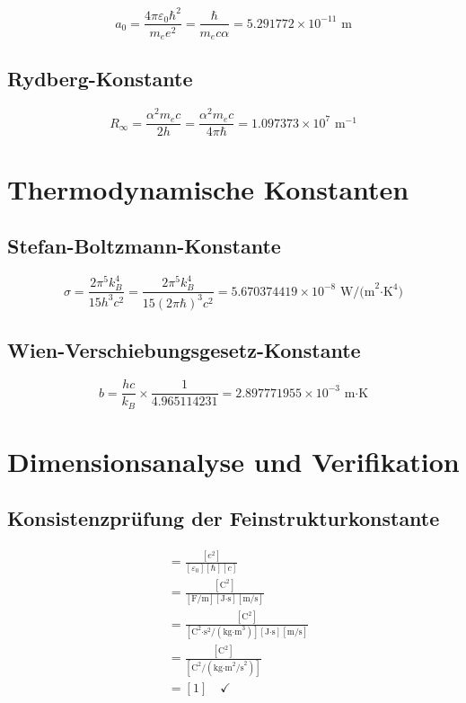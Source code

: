 	\begin{equation}
		a_0 = \frac{4\pi\varepsilon_0\hbar^2}{m_e e^2} = \frac{\hbar}{m_e c \alpha} = 5.291772 \times 10^{-11} \text{ m}
	\end{equation}
	
	\subsection{Rydberg-Konstante}
	
	\begin{equation}
		R_\infty = \frac{\alpha^2 m_e c}{2h} = \frac{\alpha^2 m_e c}{4\pi\hbar} = 1.097373 \times 10^7 \text{ m}^{-1}
	\end{equation}
	
	\section{Thermodynamische Konstanten}
	
	\subsection{Stefan-Boltzmann-Konstante}
	
	\begin{equation}
		\sigma = \frac{2\pi^5 k_B^4}{15 h^3 c^2} = \frac{2\pi^5 k_B^4}{15 (2\pi\hbar)^3 c^2} = 5.670374419 \times 10^{-8} \text{ W/(m}^2\text{·K}^4\text{)}
	\end{equation}
	
	\subsection{Wien-Verschiebungsgesetz-Konstante}
	
	\begin{equation}
		b = \frac{hc}{k_B} \times \frac{1}{4.965114231} = 2.897771955 \times 10^{-3} \text{ m·K}
	\end{equation}
	
	\section{Dimensionsanalyse und Verifikation}
	
	\subsection{Konsistenzprüfung der Feinstrukturkonstante}
	
	\begin{align}
		[\alpha] &= \frac{[e^2]}{[\varepsilon_0][\hbar][c]}\\
		&= \frac{[\text{C}^2]}{[\text{F/m}][\text{J·s}][\text{m/s}]}\\
		&= \frac{[\text{C}^2]}{[\text{C}^2\text{·s}^2/(\text{kg·m}^3)][\text{J·s}][\text{m/s}]}\\
		&= \frac{[\text{C}^2]}{[\text{C}^2/(\text{kg·m}^2\text{/s}^2)]}\\
		&= [1] \quad \checkmark
	\end{align}
	
